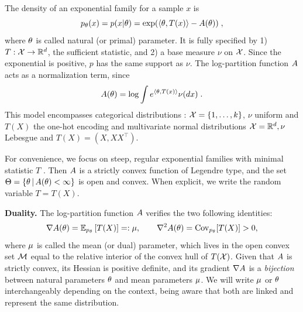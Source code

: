 The density of an exponential family for a sample $x$ is
\begin{equation}
	 p_\nat(x) = p(x|\nat) = \exp( \langle \nat, T(x) \rangle - \logpart(\nat)) \; ,
	 \label{eq:def_expfamily}
\end{equation}
where  $\nat$ is called natural (or primal) parameter.
It is fully specified by 1) $T: \cX \rightarrow \real^d$, the sufficient statistic,
and 2) a base measure $\nu$ on $\cX$.
Since the exponential is positive, $p$ has the same support as $\nu$.
The log-partition function $\logpart$ acts as a normalization term, since
\begin{align}
    \logpart(\nat) = \log \int e^{\langle \nat, T(x) \rangle} \nu(dx) \;.
\end{align}
This model encompasses categorical distributions : $\cX = \{1, \dots, k\}$, $\nu$ uniform and $T(X)$  the one-hot encoding and multivariate normal distributions $\cX=\real^d, \nu$ Lebesgue and $T(X)=(X, X X^\top)$.

For convenience, we focus on steep, regular exponential families with minimal statistic $T$ \citep{barndoffnielsen2014information}.
Then $\logpart$ is a strictly convex function of Legendre type,
and the set $\Theta = \{ \nat \cond \logpart(\nat) < \infty\}$ is open and convex.
When explicit, we write the random variable $T = T(X)$.


{\bf Duality.}
The log-partition function $\logpart$ verifies the two following identities:
\begin{align}
    \nabla\logpart(\nat) =  \expect[p_\nat]{T(X)} =: \meanp,\qquad    \nabla^2 \logpart(\nat) = \Cov_{p_\nat}[T(X)] > 0,  \label{eq:mirror-map}
\end{align}
where $\meanp$ is called the mean (or dual) parameter, which lives in the open convex set $\cM$ equal to the relative interior of the convex hull of $T(\cX)$.
Given that $\logpart$ is strictly convex, its Hessian is positive definite, and its gradient $\nabla \logpart$ is a \textit{bijection} between natural parameters $\nat$ and mean parameters $\m$.
We will write $\m$ or $\nat$ interchangeably depending on the context, being aware that both are linked and represent the same distribution.


